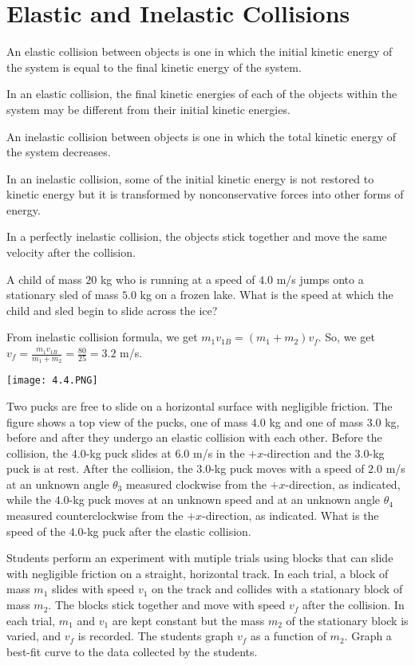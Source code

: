 \documentclass[../mech.tex]{subfiles}
\begin{document}
\section{Elastic and Inelastic Collisions}
An elastic collision between objects is one in which the initial kinetic energy of the system is equal to the final kinetic energy of the system.

In an elastic collision, the final kinetic energies of each of the objects within the system may be different from their initial kinetic energies.

An inelastic collision between objects is one in which the total kinetic energy of the system decreases.

In an inelastic collision, some of the initial kinetic energy is not restored to kinetic energy but it is transformed by nonconservative forces into other forms of energy.

In a perfectly inelastic collision, the objects stick together and move the same velocity after the collision.

\begin{example}
    A child of mass $20$ kg who is running at a speed of $4.0$ m/s jumps onto a stationary sled of mass $5.0$ kg on a frozen lake. What is the speed at which the child and sled begin to slide across the ice?

    From inelastic collision formula, we get $m_1v_{1B}=(m_1+m_2)v_f$. So, we get $v_f=\frac{m_1v_{1B}}{m_1+m_2}=\frac{80}{25}=3.2$ m/s.
\end{example}

\ex \begin{center}
    \texttt{[image: 4.4.PNG]}
\end{center}
Two pucks are free to slide on a horizontal surface with negligible friction. The figure shows a top view of the pucks, one of mass $4.0$ kg and one of mass $3.0$ kg, before and after they undergo an elastic collision with each other.
Before the collision, the $4.0$-kg puck slides at $6.0$ m/s in the $+x$-direction and the $3.0$-kg puck is at rest. After the collision, the $3.0$-kg puck moves with a speed of $2.0$ m/s at an unknown angle 
$\theta_3$ measured clockwise from the $+x$-direction, as indicated, while the $4.0$-kg puck moves at an unknown speed and at an unknown angle $\theta_4$ measured counterclockwise from the $+x$-direction, as indicated. What is the speed of the $4.0$-kg puck after the elastic collision.

\ex Students perform an experiment with mutiple trials using blocks that can slide with negligible friction on a straight, horizontal track. In each trial, a block of mass $m_1$ slides with speed $v_1$ on the track and collides with a stationary block of mass $m_2$.
The blocks stick together and move with speed $v_f$ after the collision. In each trial, $m_1$ and $v_1$ are kept constant but the mass $m_2$ of the stationary block is varied, and $v_f$ is recorded. The students graph $v_f$ as a function of $m_2$.
Graph a best-fit curve to the data collected by the students.
\end{document}
